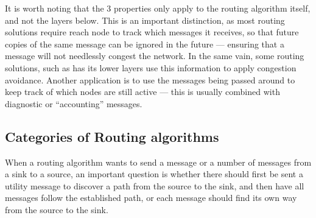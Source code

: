 \documentclass[letter, 12pt, english, draft]{article}
\begin{document}
\label{record-recived}
It is worth noting that the 3 properties only apply to the routing algorithm itself, and not the layers below. This is an important distinction, as most routing solutions require reach node to track which messages it receives, so that future copies of the same message can be ignored in the future --- ensuring that a message will not needlessly congest the network. In the same vain, some routing solutions, such as \cite{speed} has its lower layers use this information to apply congestion avoidance. Another application is to use the messages being passed around to keep track of which nodes are still active --- this is usually combined with diagnostic or ``accounting'' messages. 

\subsection{Categories of Routing algorithms}
When a routing algorithm wants to send a message or a number of messages from a sink to a source, an important question is whether there should first be sent a utility message to discover a path from the source to the sink, and then have all messages follow the established path, or each message should find its own way from the source to the sink.
\end{document}
